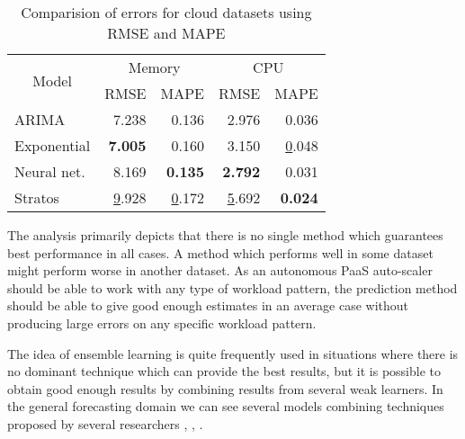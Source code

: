 \begin{table}[]
\centering
\caption{Comparision of errors for cloud datasets using RMSE and MAPE}
\begin{tabular}{|l|r|r|r|r|}
\hline
\multicolumn{1}{|c|}{\multirow{2}{*}{Model}} & \multicolumn{2}{c|}{Memory}                              & \multicolumn{2}{c|}{CPU}                              \\ \cline{2-5} 
\multicolumn{1}{|c|}{}                       & \multicolumn{1}{c|}{RMSE} & \multicolumn{1}{c|}{MAPE} & \multicolumn{1}{c|}{RMSE} & \multicolumn{1}{c|}{MAPE} \\ \hline
ARIMA                                        & 7.238                     & 0.136                     & 2.976                     & 0.036                     \\ \hline
Exponential                                  & \textbf{7.005}                     & 0.160                     & 3.150                     & {\ul 0.048}               \\ \hline
Neural net.                                  & 8.169                     & \textbf{0.135}                     & \textbf{2.792}            & 0.031                     \\ \hline
Stratos                                      & {\ul 9.928}               & {\ul 0.172}               & {\ul 5.692}               & \textbf{0.024}            \\ \hline
\end{tabular}
\end{table}
The analysis primarily depicts that there is no single method which guarantees best performance in all cases. A method which performs well in some dataset might perform worse in another dataset. As an autonomous PaaS auto-scaler should be able to work with any type of workload pattern, the prediction method should be able to give good enough estimates in an average case without producing large errors on any specific workload pattern.

The idea of ensemble learning is quite frequently used in situations where there is no dominant technique which can provide the best results, but it is possible to obtain good enough results by combining results from several weak learners. In the general forecasting domain we can see several models combining techniques proposed by several researchers \cite{Wagner_2011}, \cite{Zhang_2003}, \cite{Zou_2004}.

